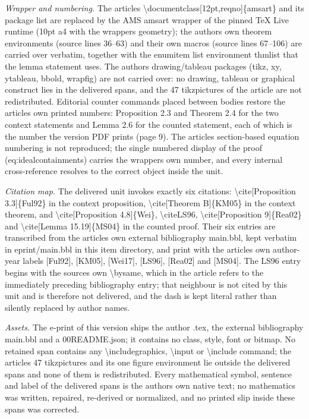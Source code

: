\documentclass[10pt,a4paper]{amsart}
\newtheorem{Main Conjecture}[theorem]{Main Conjecture}
\theoremstyle{remark}
\theoremstyle{plain}
\begin{document}
\noindent\textit{Wrapper and numbering.} The article\textquotesingle s \textbackslash{}documentclass[12pt,reqno]\{amsart\} and its package list are replaced by the AMS amsart wrapper of the pinned TeX Live runtime (10pt a4 with the wrapper\textquotesingle s geometry); the authors\textquotesingle{} own theorem environments (source lines 36--63) and their own macros (source lines 67--106) are carried over verbatim, together with the enumitem list environment thmlist that the lemma statement uses. The authors\textquotesingle{} drawing/tableau packages (tikz, xy, ytableau, bbold, wrapfig) are not carried over: no drawing, tableau or graphical construct lies in the delivered spans, and the 47 tikzpictures of the article are not redistributed. Editorial counter commands placed between bodies restore the article\textquotesingle s own printed numbers: Proposition 2.3 and Theorem 2.4 for the two context statements and Lemma 2.6 for the counted statement, each of which is the number the version PDF prints (page 9). The article\textquotesingle s section-based equation numbering is not reproduced; the single numbered display of the proof (eq:idealcontainments) carries the wrapper\textquotesingle s own number, and every internal cross-reference resolves to the correct object inside the unit.\par
\noindent\textit{Citation map.} The delivered unit invokes exactly six citations: \textbackslash{}cite[Proposition 3.3]\{Ful92\} in the context proposition, \textbackslash{}cite[Theorem B]\{KM05\} in the context theorem, and \textbackslash{}cite[Proposition 4.8]\{Wei\}, \textbackslash{}cite{LS96}, \textbackslash{}cite[Proposition 9]\{Rea02\} and \textbackslash{}cite[Lemma 15.19]\{MS04\} in the counted proof. Their six entries are transcribed from the article\textquotesingle s own external bibliography main.bbl, kept verbatim in eprint/main.bbl in this item directory, and print with the article\textquotesingle s own author-year labels [Ful92], [KM05], [Wei17], [LS96], [Rea02] and [MS04]. The LS96 entry begins with the source\textquotesingle s own \textbackslash{}bysame, which in the article refers to the immediately preceding bibliography entry; that neighbour is not cited by this unit and is therefore not delivered, and the dash is kept literal rather than silently replaced by author names.\par
\noindent\textit{Assets.} The e-print of this version ships the author .tex, the external bibliography main.bbl and a 00README.json; it contains no class, style, font or bitmap. No retained span contains any \textbackslash{}includegraphics, \textbackslash{}input or \textbackslash{}include command; the article\textquotesingle s 47 tikzpictures and its one figure environment lie outside the delivered spans and none of them is redistributed. Every mathematical symbol, sentence and label of the delivered spans is the authors\textquotesingle{} own native text; no mathematics was written, repaired, re-derived or normalized, and no printed slip inside these spans was corrected.\par
\end{document}
